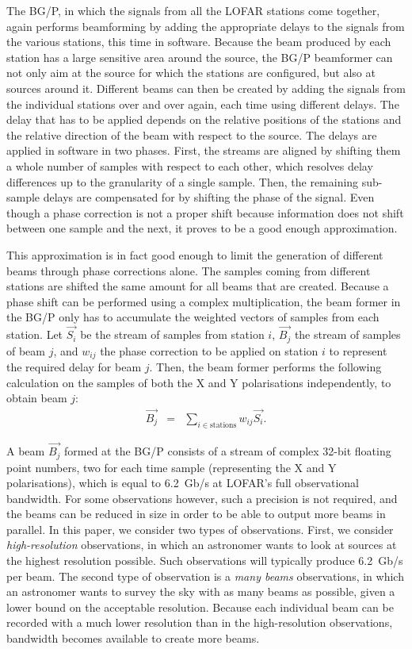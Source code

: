 \documentclass{llncs}
\begin{document}
The BG/P, in which the signals from all the LOFAR stations come together, again performs beamforming by adding the appropriate delays to the signals from the various stations, this time in software. Because the beam produced by each station has a large sensitive area around the source, the BG/P beamformer can not only aim at the source for which the stations are configured, but also at sources around it. Different beams can then be created by adding the signals from the individual stations over and over again, each time using different delays. The delay that has to be applied depends on the relative positions of the stations and the relative direction of the beam with respect to the source. The delays are applied in software in two phases. First, the streams are aligned by shifting them a whole number of samples with respect to each other, which resolves delay differences up to the granularity of a single sample. Then, the remaining sub-sample delays are compensated for by shifting the phase of the signal. Even though a phase correction is not a proper shift because information does not shift between one sample and the next, it proves to be a good enough approximation.

This approximation is in fact good enough to limit the generation of different beams through phase corrections alone. The samples coming from different stations are shifted the same amount for all beams that are created. Because a phase shift can be performed using a complex multiplication, the beam former in the BG/P only has to accumulate the weighted vectors of samples from each station. Let $\overrightarrow{S_i}$ be the stream of samples from station $i$, $\overrightarrow{B_j}$ the stream of samples of beam $j$, and $w_{ij}$ the phase correction to be applied on station $i$ to represent the required delay for beam $j$. Then, the beam former performs the following calculation on the samples of both the X and Y polarisations independently, to obtain beam $j$:
\begin{eqnarray}
\overrightarrow{B_j} & = & \sum_{i \in \textrm{stations}}w_{ij}\overrightarrow{S_i}.
\end{eqnarray}

A beam $\overrightarrow{B_j}$ formed at the BG/P consists of a stream of complex 32-bit floating point numbers, two for each time sample (representing the X and Y polarisations), which is equal to 6.2~Gb/s at LOFAR's full observational bandwidth. For some observations however, such a precision is not required, and the beams can be reduced in size in order to be able to output more beams in parallel. In this paper, we consider two types of observations. First, we consider \emph{high-resolution} observations, in which an astronomer wants to look at sources at the highest resolution possible. Such observations will typically produce 6.2~Gb/s per beam. The second type of observation is a \emph{many beams} observations, in which an astronomer wants to survey the sky with as many beams as possible, given a lower bound on the acceptable resolution. Because each individual beam can be recorded with a much lower resolution than in the high-resolution observations, bandwidth becomes available to create more beams.
\end{document}
